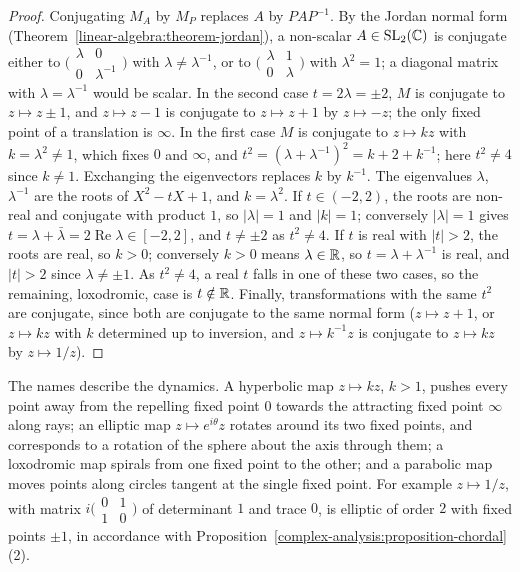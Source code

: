 \begin{proof}
Conjugating $M_A$ by $M_P$ replaces $A$ by $PAP^{-1}$. By the Jordan normal form (Theorem~\ref{linear-algebra:theorem-jordan}), a non-scalar $A \in \mathrm{SL}_2(\mathbb{C})$ is conjugate either to
$\bigl(\begin{smallmatrix}\lambda & 0\\ 0 & \lambda^{-1}\end{smallmatrix}\bigr)$ with $\lambda \neq \lambda^{-1}$, or to $\bigl(\begin{smallmatrix}\lambda & 1\\ 0 & \lambda\end{smallmatrix}\bigr)$ with $\lambda^2 = 1$; a diagonal matrix
with $\lambda = \lambda^{-1}$ would be scalar. In the second case $t = 2\lambda = \pm2$, $M$ is conjugate to $z \mapsto z \pm 1$, and $z \mapsto z - 1$ is conjugate to $z \mapsto z + 1$ by $z \mapsto -z$; the only
fixed point of a translation is $\infty$. In the first case $M$ is conjugate to $z \mapsto kz$ with $k = \lambda^2 \neq 1$, which fixes $0$ and $\infty$, and $t^2 = (\lambda + \lambda^{-1})^2 = k + 2 + k^{-1}$; here $t^2 \neq 4$
since $k \neq 1$. Exchanging the eigenvectors replaces $k$ by $k^{-1}$. The eigenvalues $\lambda$, $\lambda^{-1}$ are the roots of $X^2 - tX + 1$, and $k = \lambda^2$. If $t \in (-2, 2)$, the roots are non-real and
conjugate with product $1$, so $|\lambda| = 1$ and $|k| = 1$; conversely $|\lambda| = 1$ gives $t = \lambda + \bar\lambda = 2\operatorname{Re}\lambda \in [-2, 2]$, and $t \neq \pm2$ as $t^2 \neq 4$. If $t$ is real with $|t| > 2$, the
roots are real, so $k > 0$; conversely $k > 0$ means $\lambda \in \mathbb{R}$, so $t = \lambda + \lambda^{-1}$ is real, and $|t| > 2$ since $\lambda \neq \pm1$. As $t^2 \neq 4$, a real $t$ falls in one of these two cases, so the
remaining, loxodromic, case is $t \notin \mathbb{R}$. Finally, transformations with the same $t^2$ are
conjugate, since both are conjugate to the same normal form ($z \mapsto z + 1$, or $z \mapsto kz$ with $k$ determined up to inversion, and $z \mapsto k^{-1}z$ is conjugate to $z \mapsto kz$ by $z \mapsto 1/z$).
\end{proof}

The names describe the dynamics. A hyperbolic map $z \mapsto kz$, $k > 1$, pushes every point away from the repelling fixed point $0$ towards the attracting fixed point $\infty$ along rays; an elliptic map
$z \mapsto e^{i\theta}z$ rotates around its two fixed points, and corresponds to a rotation of the sphere about the axis through them; a loxodromic map spirals from one fixed point to the other; and a parabolic map
moves points along circles tangent at the single fixed point. For example $z \mapsto 1/z$, with matrix $i\bigl(\begin{smallmatrix}0 & 1\\ 1 & 0\end{smallmatrix}\bigr)$ of determinant $1$ and trace $0$, is elliptic of
order $2$ with fixed points $\pm1$, in accordance with Proposition~\ref{complex-analysis:proposition-chordal}(2).


